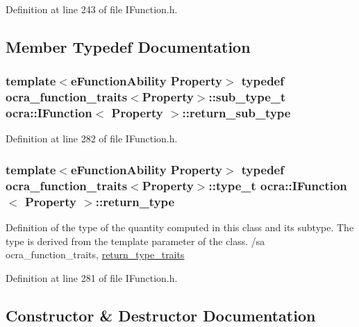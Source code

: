 Definition at line 243 of file I\+Function.\+h.



\subsection{Member Typedef Documentation}
\subsubsection[{\texorpdfstring{return\+\_\+sub\+\_\+type}{return_sub_type}}]{\setlength{\rightskip}{0pt plus 5cm}template$<$e\+Function\+Ability Property$>$ typedef ocra\+\_\+function\+\_\+traits$<$Property$>$\+::sub\+\_\+type\+\_\+t {\bf ocra\+::\+I\+Function}$<$ Property $>$\+::{\bf return\+\_\+sub\+\_\+type}}\hypertarget{classocra_1_1IFunction_ac6604adbd04613e1f545fb522cedbe3d}{}\label{classocra_1_1IFunction_ac6604adbd04613e1f545fb522cedbe3d}


Definition at line 282 of file I\+Function.\+h.

\subsubsection[{\texorpdfstring{return\+\_\+type}{return_type}}]{\setlength{\rightskip}{0pt plus 5cm}template$<$e\+Function\+Ability Property$>$ typedef ocra\+\_\+function\+\_\+traits$<$Property$>$\+::type\+\_\+t {\bf ocra\+::\+I\+Function}$<$ Property $>$\+::{\bf return\+\_\+type}}\hypertarget{classocra_1_1IFunction_a04d351c2f938d01046328b54fb7e6525}{}\label{classocra_1_1IFunction_a04d351c2f938d01046328b54fb7e6525}
Definition of the type of the quantity computed in this class and its subtype. The type is derived from the template parameter of the class. /sa ocra\+\_\+function\+\_\+traits, \hyperlink{structocra_1_1return__type__traits}{return\+\_\+type\+\_\+traits} 

Definition at line 281 of file I\+Function.\+h.



\subsection{Constructor \& Destructor Documentation}
